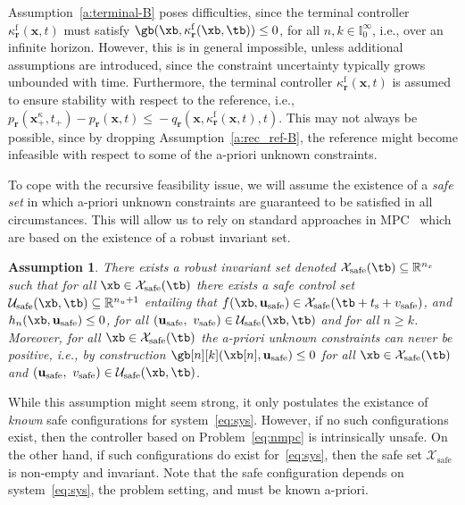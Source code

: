 \documentclass[journal]{IEEEtran}
\newcommand{\x}{{\mathbf{x}}}
\renewcommand{\u}{{\mathbf{u}}}
\renewcommand{\r}{{\mathbf{r}}}
\newcommand{\review}[1]{#1}
\newtheorem{Assumption}{Assumption}
\begin{document}
	Assumption~\ref{a:terminal-B} poses difficulties, since the terminal controller $\kappa_\r^\mathrm{f}(\x,t)$ must satisfy $\gb(\xb,\kappa^\mathrm{f}_\r(\xb,\tb))\leq 0$, for all $n,k\in\mathbb{I}_0^\infty$, i.e., over an infinite horizon. However, this is in general impossible, unless additional assumptions are introduced, since the constraint uncertainty typically grows unbounded with time. 
		Furthermore, the terminal controller $\kappa_\r^\mathrm{f}(\x,t)$ is assumed to ensure stability with respect to the reference, i.e., $p_\r(\mathbf{x}_+^\kappa,t_+) - p_\r(\mathbf{x},t) \leq{} - q_\r(\mathbf{x},\kappa^\mathrm{f}_\r(\mathbf{x},t),t)$. This may not always be possible, since by dropping Assumption~\ref{a:rec_ref-B}, the reference might become infeasible with respect to some of the a-priori unknown constraints.

		 To cope with the recursive feasibility issue, we will assume the existence of a \emph{safe set} in which a-priori unknown constraints are guaranteed to be satisfied in all circumstances. This will allow us to rely on
		 standard approaches in MPC~\cite{borrelli2017predictive,kerrigan2001robust,yu2013tube} which are based on the existence of a robust invariant set. 
	
	\begin{Assumption}\label{a:safe}
		There exists a robust invariant set denoted $\mathcal{X}_\mathrm{safe}(\tb)\subseteq\mathbb{R}^{n_x}$ such that for all $\xb\in \mathcal{X}_\mathrm{safe}(\tb)$ there exists a safe control set $\mathcal{U}_\mathrm{safe}(\xb,\tb)\subseteq\mathbb{R}^{n_u+1}$ entailing that  $f(\xb,\u_\mathrm{safe})\in\mathcal{X}_\mathrm{safe}(\tb+t_\mathrm{s}+v_\mathrm{safe})$, and $h_n(\xb,\u_\mathrm{safe})\leq{}0$, for all $(\u_\mathrm{safe},\ v_\mathrm{safe})\in\mathcal{U}_\mathrm{safe}(\xb,\tb)$ and for all $n\geq{}k$. Moreover, for all $\xb\in \mathcal{X}_\mathrm{safe}(\tb)$ the a-priori unknown constraints can never be positive, i.e., by construction $\gb[n][k](\xb[n],\u_\mathrm{safe}) \leq 0$ for all $\xb\in \mathcal{X}_\mathrm{safe}(\tb)$ and $(\u_\mathrm{safe},\ v_\mathrm{safe})\in\mathcal{U}_\mathrm{safe}(\xb,\tb)$.
	\end{Assumption}
	\review{While this assumption might seem strong, it only postulates the existance of \emph{known} safe configurations for system~\eqref{eq:sys}. However, if no such configurations exist, then the controller based on Problem~\eqref{eq:nmpc} is intrinsically unsafe. On the other hand, if such configurations do exist for~\eqref{eq:sys}, then the safe set $\mathcal{X}_\mathrm{safe}$ is non-empty and invariant. Note that the safe configuration depends on system~\eqref{eq:sys}, the problem setting, and must be known a-priori.}
		
\end{document}
